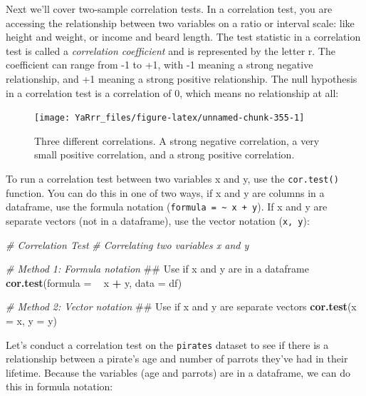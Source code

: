 \documentclass[]{book}
\newenvironment{Shaded}{\begin{snugshade}}{\end{snugshade}}
\newcommand{\KeywordTok}[1]{\textcolor[rgb]{0.13,0.29,0.53}{\textbf{#1}}}
\newcommand{\DataTypeTok}[1]{\textcolor[rgb]{0.13,0.29,0.53}{#1}}
\newcommand{\StringTok}[1]{\textcolor[rgb]{0.31,0.60,0.02}{#1}}
\newcommand{\CommentTok}[1]{\textcolor[rgb]{0.56,0.35,0.01}{\textit{#1}}}
\newcommand{\OperatorTok}[1]{\textcolor[rgb]{0.81,0.36,0.00}{\textbf{#1}}}
\newcommand{\NormalTok}[1]{#1}
\theoremstyle{definition}
\theoremstyle{definition}
\theoremstyle{remark}
\begin{document}
Next we'll cover two-sample correlation tests. In a correlation test,
you are accessing the relationship between two variables on a ratio or
interval scale: like height and weight, or income and beard length. The
test statistic in a correlation test is called a \emph{correlation
coefficient} and is represented by the letter r. The coefficient can
range from -1 to +1, with -1 meaning a strong negative relationship, and
+1 meaning a strong positive relationship. The null hypothesis in a
correlation test is a correlation of 0, which means no relationship at
all:

\begin{figure}

{\centering \texttt{[image: YaRrr\_files/figure-latex/unnamed-chunk-355-1]} 

}

\caption{Three different correlations. A strong negative correlation, a very small positive correlation, and a strong positive correlation.}\label{fig:unnamed-chunk-355}
\end{figure}

To run a correlation test between two variables x and y, use the
\texttt{cor.test()} function. You can do this in one of two ways, if x
and y are columns in a dataframe, use the formula notation
(\texttt{formula\ =\ \textasciitilde{}\ x\ +\ y}). If x and y are
separate vectors (not in a dataframe), use the vector notation
(\texttt{x,\ y}):

\begin{Shaded}
\begin{Highlighting}[]
\CommentTok{# Correlation Test}
\CommentTok{#   Correlating two variables x and y}

\CommentTok{# Method 1: Formula notation}
\NormalTok{##  Use if x and y are in a dataframe}
\KeywordTok{cor.test}\NormalTok{(}\DataTypeTok{formula =} \OperatorTok{~}\StringTok{ }\NormalTok{x }\OperatorTok{+}\StringTok{ }\NormalTok{y,}
         \DataTypeTok{data =}\NormalTok{ df)}

\CommentTok{# Method 2: Vector notation}
\NormalTok{## Use if x and y are separate vectors}
\KeywordTok{cor.test}\NormalTok{(}\DataTypeTok{x =}\NormalTok{ x,}
         \DataTypeTok{y =}\NormalTok{ y)}
\end{Highlighting}
\end{Shaded}

Let's conduct a correlation test on the \texttt{pirates} dataset to see
if there is a relationship between a pirate's age and number of parrots
they've had in their lifetime. Because the variables (age and parrots)
are in a dataframe, we can do this in formula notation:
\end{document}

